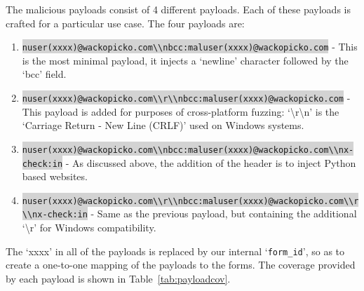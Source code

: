 The malicious payloads consist of 4 different payloads. Each of these payloads is crafted for a particular use case. The four payloads are:
\lstset{language=html}
\begin{enumerate}
	\item
	\colorbox{lightgray}{\lstinline{nuser(xxxx)@wackopicko.com\\nbcc:maluser(xxxx)@wackopicko.com}} - This is the most minimal payload, it injects a `newline' character followed by the `bcc' field.
	\item \colorbox{lightgray}{\lstinline{nuser(xxxx)@wackopicko.com\\r\\nbcc:maluser(xxxx)@wackopicko.com}} - This payload is added for purposes of cross-platform fuzzing: `\textbackslash{}r\textbackslash{}n' is the `Carriage Return - New Line (CRLF)' used on Windows systems. 
	\item \colorbox{lightgray}{\lstinline{nuser(xxxx)@wackopicko.com\\nbcc:maluser(xxxx)@wackopicko.com\\nx-check:in}} - As discussed above, the addition of the  header is to inject Python based websites.
	\item \colorbox{lightgray}{\lstinline{nuser(xxxx)@wackopicko.com\\r\\nbcc:maluser(xxxx)@wackopicko.com\\r\\nx-check:in}} - Same as the previous payload, but containing the additional `\textbackslash{}r' for Windows compatibility.
	
\end{enumerate}
The `xxxx' in all of the payloads is replaced by our internal `\lstinline{form_id}', so as to create a one-to-one mapping of the payloads to the forms. The coverage provided by each payload is shown in Table~\ref{tab:payloadcov}.\\

